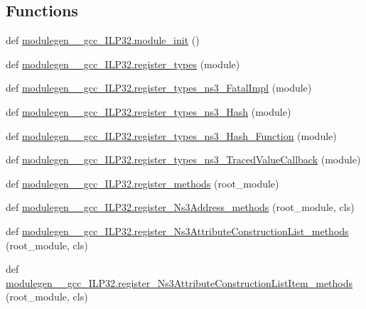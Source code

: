 \subsection*{Functions}
\begin{DoxyCompactItemize}
\item 
def \hyperlink{namespacemodulegen____gcc__ILP32_adeca9ed3c99593bd5eb3b0bd7981c321}{modulegen\+\_\+\+\_\+gcc\+\_\+\+I\+L\+P32.\+module\+\_\+init} ()
\item 
def \hyperlink{namespacemodulegen____gcc__ILP32_af565b2741bb1cd768d289459114389b9}{modulegen\+\_\+\+\_\+gcc\+\_\+\+I\+L\+P32.\+register\+\_\+types} (module)
\item 
def \hyperlink{namespacemodulegen____gcc__ILP32_aab873702fb2d41d9a78db27492ae87a5}{modulegen\+\_\+\+\_\+gcc\+\_\+\+I\+L\+P32.\+register\+\_\+types\+\_\+ns3\+\_\+\+Fatal\+Impl} (module)
\item 
def \hyperlink{namespacemodulegen____gcc__ILP32_a0bce51bcadf44c501181b3a56b927a40}{modulegen\+\_\+\+\_\+gcc\+\_\+\+I\+L\+P32.\+register\+\_\+types\+\_\+ns3\+\_\+\+Hash} (module)
\item 
def \hyperlink{namespacemodulegen____gcc__ILP32_af8a17079f3fe7bb312bb8a09266937fa}{modulegen\+\_\+\+\_\+gcc\+\_\+\+I\+L\+P32.\+register\+\_\+types\+\_\+ns3\+\_\+\+Hash\+\_\+\+Function} (module)
\item 
def \hyperlink{namespacemodulegen____gcc__ILP32_a1410eba4e1bf09d877cd7bd0ae8e66ef}{modulegen\+\_\+\+\_\+gcc\+\_\+\+I\+L\+P32.\+register\+\_\+types\+\_\+ns3\+\_\+\+Traced\+Value\+Callback} (module)
\item 
def \hyperlink{namespacemodulegen____gcc__ILP32_a94ccb7f04a4251f5353b68c8c69cb5fa}{modulegen\+\_\+\+\_\+gcc\+\_\+\+I\+L\+P32.\+register\+\_\+methods} (root\+\_\+module)
\item 
def \hyperlink{namespacemodulegen____gcc__ILP32_afc9e83375dc30250cd5d7973f09379a5}{modulegen\+\_\+\+\_\+gcc\+\_\+\+I\+L\+P32.\+register\+\_\+\+Ns3\+Address\+\_\+methods} (root\+\_\+module, cls)
\item 
def \hyperlink{namespacemodulegen____gcc__ILP32_a8e5f62edcbcf1da6ad9a86c08224bd88}{modulegen\+\_\+\+\_\+gcc\+\_\+\+I\+L\+P32.\+register\+\_\+\+Ns3\+Attribute\+Construction\+List\+\_\+methods} (root\+\_\+module, cls)
\item 
def \hyperlink{namespacemodulegen____gcc__ILP32_ace7f1f66407f5bc96929772acd5a537c}{modulegen\+\_\+\+\_\+gcc\+\_\+\+I\+L\+P32.\+register\+\_\+\+Ns3\+Attribute\+Construction\+List\+Item\+\_\+methods} (root\+\_\+module, cls)
\item 

\end{DoxyCompactItemize}
